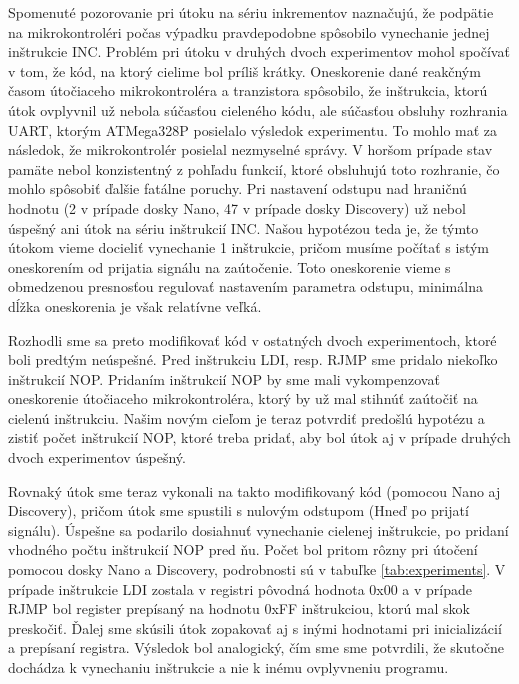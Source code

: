 Spomenuté pozorovanie pri útoku na sériu inkrementov naznačujú, že podpätie na mikrokontroléri počas výpadku pravdepodobne spôsobilo vynechanie jednej inštrukcie INC. Problém pri útoku v druhých dvoch experimentov mohol spočívať v tom, že kód, na ktorý cielime bol príliš krátky. Oneskorenie dané reakčným časom útočiaceho mikrokontroléra a tranzistora spôsobilo, že inštrukcia, ktorú útok ovplyvnil už nebola súčasťou cieleného kódu, ale súčasťou obsluhy rozhrania UART, ktorým ATMega328P posielalo výsledok experimentu. To mohlo mať za následok, že mikrokontrolér posielal nezmyselné správy. V horšom prípade stav pamäte nebol konzistentný z pohľadu funkcií, ktoré obsluhujú toto rozhranie, čo mohlo spôsobiť ďalšie fatálne poruchy. Pri nastavení odstupu nad hraničnú hodnotu (2 v prípade dosky Nano, 47 v prípade dosky Discovery) už nebol úspešný ani útok na sériu inštrukcií INC. Našou hypotézou teda je, že týmto útokom vieme docieliť vynechanie 1 inštrukcie, pričom musíme počítať s istým oneskorením od prijatia signálu na zaútočenie. Toto oneskorenie vieme s obmedzenou presnosťou regulovať nastavením parametra odstupu, minimálna dĺžka oneskorenia je však relatívne veľká.

Rozhodli sme sa preto modifikovať kód v ostatných dvoch experimentoch, ktoré boli predtým neúspešné. Pred inštrukciu LDI, resp. RJMP sme pridalo niekoľko inštrukcií NOP. Pridaním inštrukcií NOP by sme mali vykompenzovať oneskorenie útočiaceho mikrokontroléra, ktorý by už mal stihnúť zaútočiť na cielenú inštrukciu. Našim novým cieľom je teraz potvrdiť predošlú hypotézu a zistiť počet inštrukcií NOP, ktoré treba pridať, aby bol útok aj v prípade druhých dvoch experimentov úspešný.

Rovnaký útok sme teraz vykonali na takto modifikovaný kód (pomocou Nano aj Discovery), pričom útok sme spustili s nulovým odstupom (Hneď po prijatí signálu). Úspešne sa podarilo dosiahnuť vynechanie cielenej inštrukcie, po pridaní vhodného počtu inštrukcií NOP pred ňu. Počet bol pritom rôzny pri útočení pomocou dosky Nano a Discovery, podrobnosti sú v tabuľke \ref{tab:experiments}. V prípade inštrukcie LDI zostala v registri pôvodná hodnota 0x00 a v prípade RJMP bol register prepísaný na hodnotu 0xFF inštrukciou, ktorú mal skok preskočiť. Ďalej sme skúsili útok zopakovať aj s inými hodnotami pri inicializácií a prepísaní registra. Výsledok bol analogický, čím sme  sme potvrdili, že skutočne dochádza k vynechaniu inštrukcie a nie k inému ovplyvneniu programu.

